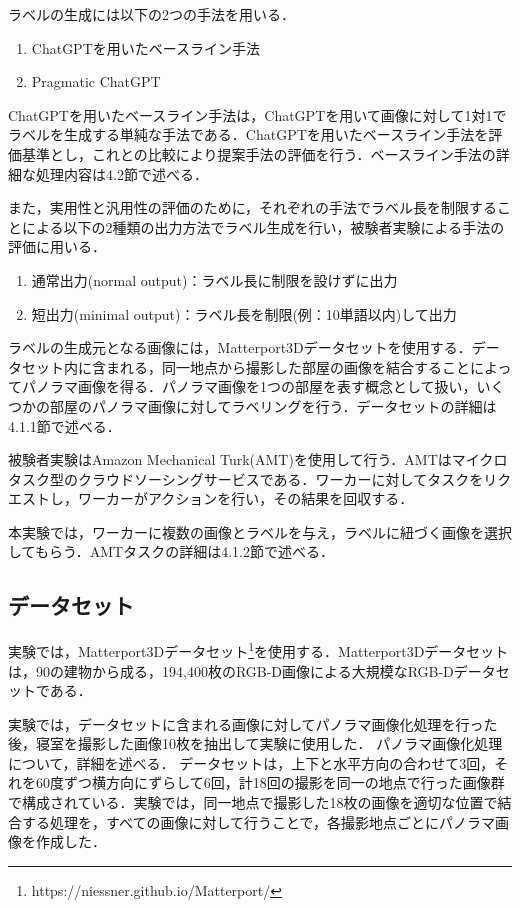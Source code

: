 \documentclass[a4paper,11pt]{jreport}
\begin{document}
ラベルの生成には以下の2つの手法を用いる．
\begin{enumerate}
    \item ChatGPTを用いたベースライン手法
    \item Pragmatic ChatGPT
\end{enumerate}

ChatGPTを用いたベースライン手法は，ChatGPTを用いて画像に対して1対1でラベルを生成する単純な手法である．ChatGPTを用いたベースライン手法を評価基準とし，これとの比較により提案手法の評価を行う．ベースライン手法の詳細な処理内容は4.2節で述べる．

また，実用性と汎用性の評価のために，それぞれの手法でラベル長を制限することによる以下の2種類の出力方法でラベル生成を行い，被験者実験による手法の評価に用いる．

\begin{enumerate}
    \item 通常出力(normal output)：ラベル長に制限を設けずに出力
    \item 短出力(minimal output)：ラベル長を制限(例：10単語以内)して出力
\end{enumerate}

ラベルの生成元となる画像には，Matterport3Dデータセットを使用する．データセット内に含まれる，同一地点から撮影した部屋の画像を結合することによってパノラマ画像を得る．パノラマ画像を1つの部屋を表す概念として扱い，いくつかの部屋のパノラマ画像に対してラベリングを行う．データセットの詳細は4.1.1節で述べる．

被験者実験はAmazon Mechanical Turk(AMT)を使用して行う．AMTはマイクロタスク型のクラウドソーシングサービスである．ワーカーに対してタスクをリクエストし，ワーカーがアクションを行い，その結果を回収する．

本実験では，ワーカーに複数の画像とラベルを与え，ラベルに紐づく画像を選択してもらう．AMTタスクの詳細は4.1.2節で述べる．

\subsection{データセット}

実験では，Matterport3Dデータセット\footnote{https://niessner.github.io/Matterport/}を使用する．Matterport3Dデータセットは，90の建物から成る，194,400枚のRGB-D画像による大規模なRGB-Dデータセットである．

実験では，データセットに含まれる画像に対してパノラマ画像化処理を行った後，寝室を撮影した画像10枚を抽出して実験に使用した．
パノラマ画像化処理について，詳細を述べる．
データセットは，上下と水平方向の合わせて3回，それを60度ずつ横方向にずらして6回，計18回の撮影を同一の地点で行った画像群で構成されている．実験では，同一地点で撮影した18枚の画像を適切な位置で結合する処理を，すべての画像に対して行うことで，各撮影地点ごとにパノラマ画像を作成した．
\end{document}
